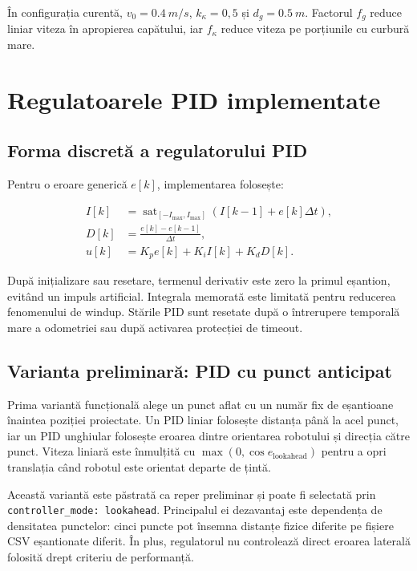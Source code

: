 \documentclass[12pt,a4paper,oneside]{report}
\newcommand{\sat}{\operatorname{sat}}
\begin{document}
În configurația curentă, $v_0=\SI{0.4}{m/s}$,
$k_\kappa=0{,}5$ și $d_g=\SI{0.5}{m}$. Factorul $f_g$ reduce liniar viteza în
apropierea capătului, iar $f_\kappa$ reduce viteza pe porțiunile cu curbură mare.

\chapter{Regulatoarele PID implementate}

\section{Forma discretă a regulatorului PID}

Pentru o eroare generică $e[k]$, implementarea folosește:

\begin{align}
  I[k] &= \sat_{[-I_{\max},I_{\max}]}
          \left(I[k-1]+e[k]\Delta t\right), \\
  D[k] &= \frac{e[k]-e[k-1]}{\Delta t}, \\
  u[k] &= K_p e[k]+K_i I[k]+K_d D[k].
\end{align}

După inițializare sau resetare, termenul derivativ este zero la primul eșantion,
evitând un impuls artificial. Integrala memorată este limitată pentru reducerea
fenomenului de windup. Stările PID sunt resetate după o întrerupere temporală
mare a odometriei sau după activarea protecției de timeout.

\section{Varianta preliminară: PID cu punct anticipat}

Prima variantă funcțională alege un punct aflat cu un număr fix de eșantioane
înaintea poziției proiectate. Un PID liniar folosește distanța până la acel punct,
iar un PID unghiular folosește eroarea dintre orientarea robotului și direcția
către punct. Viteza liniară este înmulțită cu
$\max(0,\cos e_{\mathrm{lookahead}})$ pentru a opri translația când robotul este
orientat departe de țintă.

Această variantă este păstrată ca reper preliminar și poate fi selectată prin
\texttt{controller\_mode: lookahead}. Principalul ei dezavantaj este dependența
de densitatea punctelor: cinci puncte pot însemna distanțe fizice diferite pe
fișiere CSV eșantionate diferit. În plus, regulatorul nu controlează direct
eroarea laterală folosită drept criteriu de performanță.
\end{document}
